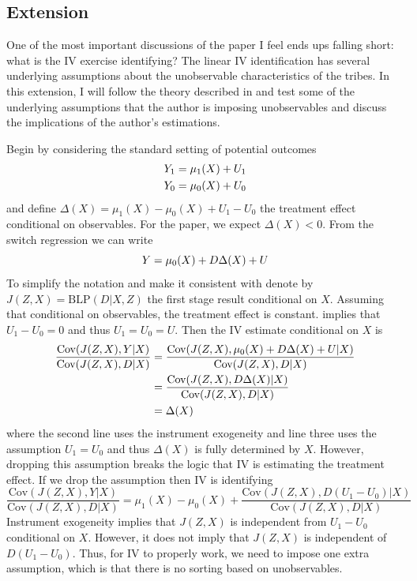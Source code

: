 \subsection*{Extension}
One of the most important discussions of the paper I feel ends ups falling short: what is the IV exercise identifying? The linear IV identification has several underlying assumptions about the unobservable characteristics of the tribes. In this extension, I will follow the theory described in \citet{Heckman05} and test some of the underlying assumptions that the author is imposing unobservables and discuss the implications of the author's estimations. 

Begin by considering the standard setting of potential outcomes \vspace{-18pt}
\begin{align*}
    Y_1 &= \mu_1(X) + U_1 \\ 
    Y_0 &= \mu_0(X) + U_0 \vspace{-13pt}
\end{align*}
and define $\Delta(X) = \mu_1(X)-\mu_0(X) + U_1-U_0$ the treatment effect conditional on observables. For the paper, we expect $\Delta(X)<0$. From the switch regression we can write \vspace{-18pt}
\begin{equation*}
    Y = \mu_0(X) + D\Delta(X) + U \vspace{-13pt}
\end{equation*}
To simplify the notation and make it consistent with \citet{Heckman05} denote by $J(Z,X)=\text{BLP}(D\vert X,Z)$ the first stage result conditional on $X$. Assuming that conditional on observables, the treatment effect is constant. implies that $U_1-U_0=0$ and thus $U_1=U_0=U$. Then the IV estimate conditional on $X$ is \vspace{-10pt}
\begin{align*}
    \frac{\text{Cov}(J(Z,X),Y\vert X)}{\text{Cov}(J(Z,X),D\vert X)} &= \frac{\text{Cov}(J(Z,X),\mu_0(X) + D\Delta(X) + U\vert X)}{\text{Cov}(J(Z,X),D\vert X)} \\ 
    &= \frac{\text{Cov}(J(Z,X),D\Delta(X) \vert X)}{\text{Cov}(J(Z,X),D\vert X)} \\
    &= \Delta(X) \vspace{-13pt}
\end{align*}
where the second line uses the instrument exogeneity and line three uses the assumption $U_1=U_0$ and thus $\Delta(X)$ is fully determined by $X$. However, dropping this assumption breaks the logic that IV is estimating the treatment effect. If we drop the assumption then IV is identifying \vspace{-13pt}
\begin{equation*}
    \frac{\text{Cov}(J(Z,X),Y\vert X)}{\text{Cov}(J(Z,X),D\vert X)} = \mu_1(X)-\mu_0(X) + \frac{\text{Cov}(J(Z,X),D(U_1-U_0) \vert X)}{\text{Cov}(J(Z,X),D\vert X)}
\end{equation*}
Instrument exogeneity implies that $J(Z,X)$ is independent from $U_1-U_0$ conditional on $X$. However, it does not imply that $J(Z,X)$ is independent of $D(U_1-U_0)$. Thus, for IV to properly work, we need to impose one extra assumption, which is that there is no sorting based on unobservables.

